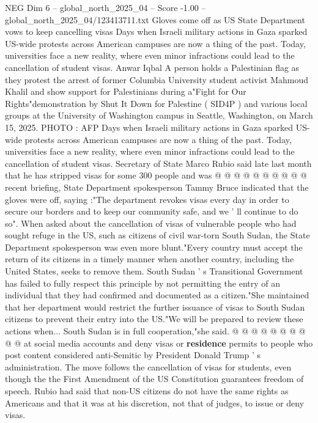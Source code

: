 \begin{textsample}{NEG Dim 6 – global\_north\_2025\_04 – Score -1.00 – global\_north\_2025\_04/123413711.txt}  \label{ex:f6_neg_260}
Gloves come off as US State Department vows to keep cancelling visas Days when Israeli military actions in Gaza sparked US-wide protests across American campuses are now a thing of the past.
Today, universities face a new reality, where even minor infractions could lead to the cancellation of student visas.
Anwar Iqbal A person holds a Palestinian flag as they protest the arrest of former Columbia University student activist Mahmoud Khalil and show support for Palestinians during a"Fight for Our Rights"demonstration by Shut It Down for Palestine ( SID4P ) and various local groups at the University of Washington campus in Seattle, Washington, on March 15, 2025.
PHOTO : AFP Days when Israeli military actions in Gaza sparked US-wide protests across American campuses are now a thing of the past.
Today, universities face a new reality, where even minor infractions could lead to the cancellation of student visas.
Secretary of State Marco Rubio said late last month that he has stripped visas for some 300 people and was @ @ @ @ @ @ @ @ @ @ recent briefing, State Department spokesperson Tammy Bruce indicated that the gloves were off, saying :"The department revokes visas every day in order to secure our borders and to keep our community safe, and we ' ll continue to do so".
When asked about the cancellation of visas of vulnerable people who had sought refuge in the US, such as citizens of civil war-torn South Sudan, the State Department spokesperson was even more blunt."Every country must accept the return of its citizens in a timely manner when another country, including the United States, seeks to remove them.
South Sudan ' s Transitional Government has failed to fully respect this principle by not permitting the entry of an individual that they had confirmed and documented as a citizen."She maintained that her department would restrict the further issuance of visas to South Sudan citizens to prevent their entry into the US."We will be prepared to review these actions when...
South Sudan is in full cooperation,"she said. @ @ @ @ @ @ @ @ @ @ at social media accounts and deny visas or \textbf{residence} permits to people who post content considered anti-Semitic by President Donald Trump ' s administration.
The move follows the cancellation of visas for students, even though the the First Amendment of the US Constitution guarantees freedom of speech.
Rubio had said that non-US citizens do not have the same rights as Americans and that it was at his discretion, not that of judges, to issue or deny visas.

\end{textsample}
